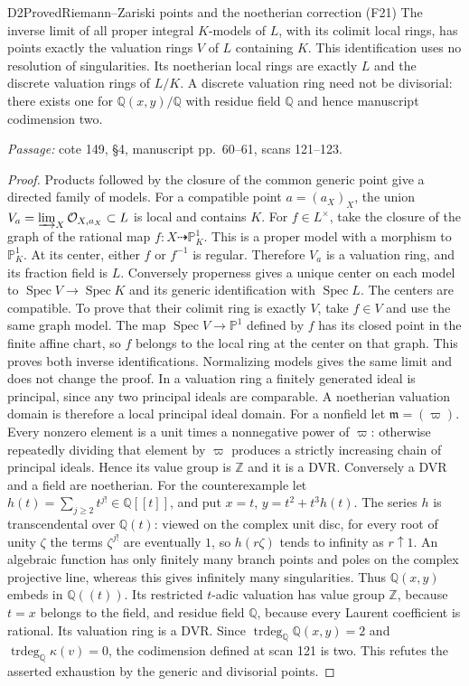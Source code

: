 \begin{result}{D2}{Proved}{Riemann--Zariski points and the noetherian correction (F21)}
The inverse limit of all proper integral $K$-models of $L$, with its colimit local rings, has points exactly the valuation rings $V$ of $L$ containing $K$. This identification uses no resolution of singularities. Its noetherian local rings are exactly $L$ and the discrete valuation rings of $L/K$. A discrete valuation ring need not be divisorial: there exists one for $\mathbb Q(x,y)/\mathbb Q$ with residue field $\mathbb Q$ and hence manuscript codimension two.
\par\emph{Passage:} cote 149, \S4, manuscript pp.~60--61, scans 121--123.
\end{result}
\begin{proof}
Products followed by the closure of the common generic point give a directed family of models. For a compatible point $a=(a_X)_X$, the union $V_a=\varinjlim_X\mathcal O_{X,a_X}\subset L$ is local and contains $K$. For $f\in L^\times$, take the closure of the graph of the rational map $f:X\dashrightarrow\mathbb P^1_K$. This is a proper model with a morphism to $\mathbb P^1_K$. At its center, either $f$ or $f^{-1}$ is regular. Therefore $V_a$ is a valuation ring, and its fraction field is $L$.
Conversely properness gives a unique center on each model to $\operatorname{Spec}V\to\operatorname{Spec}K$ and its generic identification with $\operatorname{Spec}L$. The centers are compatible. To prove that their colimit ring is exactly $V$, take $f\in V$ and use the same graph model. The map $\operatorname{Spec}V\to\mathbb P^1$ defined by $f$ has its closed point in the finite affine chart, so $f$ belongs to the local ring at the center on that graph. This proves both inverse identifications. Normalizing models gives the same limit and does not change the proof.
In a valuation ring a finitely generated ideal is principal, since any two principal ideals are comparable. A noetherian valuation domain is therefore a local principal ideal domain. For a nonfield let $\mathfrak m=(\varpi)$. Every nonzero element is a unit times a nonnegative power of $\varpi$: otherwise repeatedly dividing that element by $\varpi$ produces a strictly increasing chain of principal ideals. Hence its value group is $\mathbb Z$ and it is a DVR. Conversely a DVR and a field are noetherian.
For the counterexample let $h(t)=\sum_{j\ge2}t^{j!}\in\mathbb Q[[t]]$, and put $x=t$, $y=t^2+t^3h(t)$. The series $h$ is transcendental over $\mathbb Q(t)$: viewed on the complex unit disc, for every root of unity $\zeta$ the terms $\zeta^{j!}$ are eventually $1$, so $h(r\zeta)$ tends to infinity as $r\uparrow1$. An algebraic function has only finitely many branch points and poles on the complex projective line, whereas this gives infinitely many singularities. Thus $\mathbb Q(x,y)$ embeds in $\mathbb Q((t))$. Its restricted $t$-adic valuation has value group $\mathbb Z$, because $t=x$ belongs to the field, and residue field $\mathbb Q$, because every Laurent coefficient is rational. Its valuation ring is a DVR. Since $\operatorname{trdeg}_{\mathbb Q}\mathbb Q(x,y)=2$ and $\operatorname{trdeg}_{\mathbb Q}\kappa(v)=0$, the codimension defined at scan 121 is two. This refutes the asserted exhaustion by the generic and divisorial points.

\end{proof}
